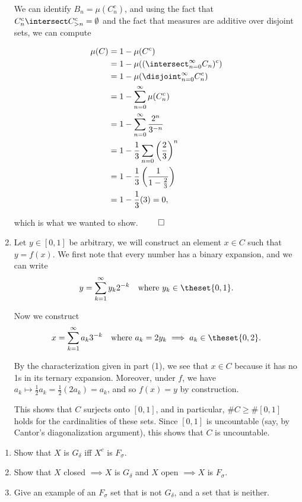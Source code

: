 \begin{solution}
\begin{enumerate}
    We can identify $B_n = \mu(C_n^c)$, and using the fact that $C_n^c \intersect C_{>n}^c = \emptyset$ and the fact that measures are additive over disjoint sets, we can compute

    \[
    \begin{align*}
      \mu(C) &= 1 - \mu(C^c) \\
             &= 1 - \mu((\intersect_{n=0}^\infty C_n)^c) \\
             &= 1 - \mu(\disjoint_{n=0}^\infty C_n^c) \\
             &= 1 - \sum_{n=0}^\infty \mu(C_n^c) \\
             &= 1 - \sum_{n=0}^\infty \frac{2^n}{3^{-n}} \\
             &= 1 - \frac 1 3 \sum_{n=0} \left( \frac 2 3 \right)^n \\
             &= 1 - \frac 1 3 \left( \frac 1 {1-\frac 2 3} \right) \\
             &= 1 - \frac 1 3 (3)  = 0,
    \end{align*}
    \]

    which is what we wanted to show. $\qed$

  \item Let $y\in [0,1]$ be arbitrary, we will construct an element $x\in C$ such that $y = f(x)$. We first note that every number has a binary expansion, and we can write
    $$
    y = \sum_{k=1}^\infty y_k 2^{-k} \quad\text{where } y_k \in \theset{0, 1}.
    $$

    Now we construct
    $$
    x = \sum_{k=1}^\infty a_k 3^{-k}\quad\text{where } a_k = 2y_k \implies a_k \in \theset{0, 2}.
    $$

    By the characterization given in part (1), we see that $x\in C$ because it has no 1s in its ternary expansion. Moreover, under $f$, we have $a_k \mapsto \frac 1 2 a_k = \frac 1 2 (2 a_k) = a_k$, and so $f(x) = y$ by construction.

    This shows that $C$ surjects onto $[0,1]$, and in particular, $\# C \geq \#[0, 1]$ holds for the cardinalities of these sets. Since $[0,1]$ is uncountable (say, by Cantor's diagonalization argument), this shows that $C$ is uncountable.
  \end{enumerate}
\end{solution}

\begin{problem}\hfill
  \begin{enumerate}
    \item Show that $X$ is $G_\delta$ iff $X^c$ is $F_\sigma$.
    \item Show that $X$ closed $\implies X$ is $G_\delta$ and $X$ open $\implies X$ is $F_\sigma$.
    \item Give an example of an $F_\sigma$ set that is not $G_\delta$, and a set that is neither.
  \end{enumerate}
\end{problem}


